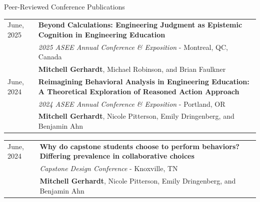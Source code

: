\documentclass{resume}
\begin{document}
\begin{rSection}{Peer-Reviewed Conference Publications}
\begin{tabularx}{\textwidth}{p{2.5cm}X}
June, 2025 & \textbf{Beyond Calculations: Engineering Judgment as Epistemic Cognition in Engineering Education} \hspace{2em [\href{https://peer.asee.org/beyond-calculations-engineering-judgment-as-epistemic-cognition-in-engineering-education}{Paper}]} \\
& \emph{2025 ASEE Annual Conference \& Exposition} - Montreal, QC, Canada \\
& \textbf{Mitchell Gerhardt}, Michael Robinson, and Brian Faulkner \\[1em]

June, 2024 & \textbf{Reimagining Behavioral Analysis in Engineering Education: A Theoretical Exploration of Reasoned Action Approach} \hspace{2em [\href{https://peer.asee.org/47934}{Paper}]} \\
& \emph{2024 ASEE Annual Conference \& Exposition} - Portland, OR \\
& \textbf{Mitchell Gerhardt}, Nicole Pitterson, Emily Dringenberg, and Benjamin Ahn \\
\end{tabularx}

\begin{tabularx}{\textwidth}{p{2.5cm}X}

June, 2024 & \textbf{Why do capstone students choose to perform behaviors? Differing prevalence in collaborative choices} \hspace{2em [\href{https://capstonedesigncommunity.org/sites/default/files/proceedings_papers/Gerhardt-CDC24.pdf}{Paper}]} \\
& \emph{Capstone Design Conference} - Knoxville, TN \\
& \textbf{Mitchell Gerhardt}, Nicole Pitterson, Emily Dringenberg, and Benjamin Ahn \\

\end{tabularx}
\endgroup
\end{rSection}
\end{document}
